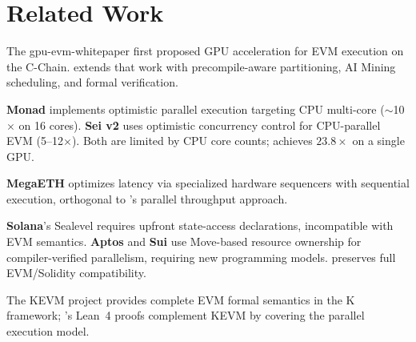 \section{Related Work}

\label{sec:related}

The \Lux{} gpu-evm-whitepaper \cite{lux-gpu-evm} first proposed GPU acceleration for EVM execution on the \Lux{} C-Chain.
\cevm{} extends that work with precompile-aware partitioning, AI Mining scheduling, and formal verification.

\textbf{Monad} \cite{monad2024} implements optimistic parallel execution targeting CPU multi-core ($\sim$10$\times$ on 16 cores).
\textbf{Sei v2} \cite{sei2024} uses optimistic concurrency control for CPU-parallel EVM (5--12$\times$).
Both are limited by CPU core counts; \cevm{} achieves $23.8\times$ on a single GPU.

\textbf{MegaETH} \cite{megaeth2024} optimizes latency via specialized hardware sequencers with sequential execution, orthogonal to \cevm{}'s parallel throughput approach.

\textbf{Solana}'s Sealevel \cite{solana2020} requires upfront state-access declarations, incompatible with EVM semantics.
\textbf{Aptos} and \textbf{Sui} use Move-based resource ownership for compiler-verified parallelism, requiring new programming models.
\cevm{} preserves full EVM/Solidity compatibility.

The KEVM project \cite{kevm2018} provides complete EVM formal semantics in the K framework; \cevm{}'s Lean~4 proofs complement KEVM by covering the parallel execution model.

